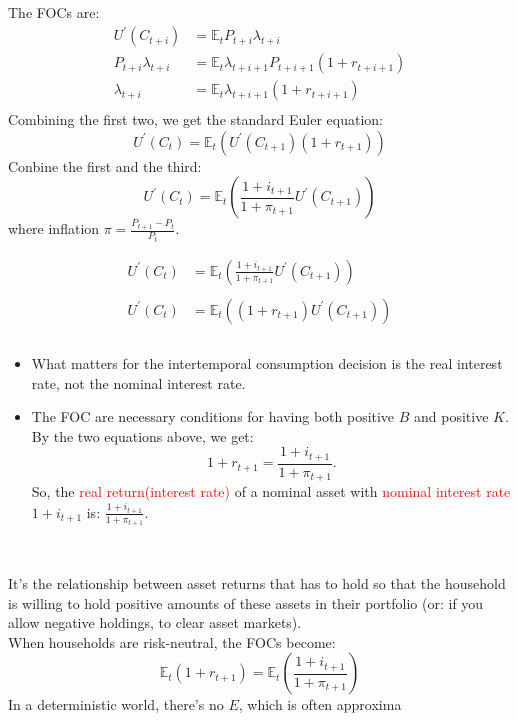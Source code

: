 The FOCs are:
\begin{align*}
    U^{\prime} (C_{t+i} ) &= \mathbb{E}_t P_{t+i}\lambda_{t+i}  \\
    P_{t+i}\lambda_{t+i} &= \mathbb{E}_t \lambda_{t+i+1} P_{t+i+1} (1+r_{t+i+1}) \\
    \lambda_{t+i} &= \mathbb{E}_t \lambda_{t+i+1} (1+r_{t+i+1}) \\
\end{align*}
Combining the first two, we get the standard Euler equation:
\[
    U^{\prime} (C_{t} ) = \mathbb{E}_t \left(U^{\prime} (C_{t+1} ) (1+r_{t+1})\right)
\]
Conbine the first and the third:
\[
    U^{\prime} (C_{t} ) = \mathbb{E}_t \left(\frac{1+i_{t+1}}{1+\pi_{t+1}} U^{\prime} (C_{t+1} )\right)
\]
where inflation $\pi = \frac{P_{t+1} - P_t}{P_t}$.

\begin{align*}
    U^{\prime} (C_{t} ) &= \mathbb{E}_t \left(\frac{1+i_{t+1}}{1+\pi_{t+1}} U^{\prime} (C_{t+1} )\right) \\\\
    U^{\prime} (C_{t} ) &= \mathbb{E}_t \left((1+r_{t+1}) U^{\prime} (C_{t+1} )\right) \\\\
\end{align*}

\begin{itemize}
    \item What matters for the intertemporal consumption decision is
    the real interest rate, not the nominal interest rate.
    \item The FOC are necessary conditions for having both positive $B$
    and positive $K$. By the two equations above, we get:
    \[1+r_{t+1} = \frac{1+i_{t+1}}{1+\pi_{t+1}}. \]
    So, the \textcolor{red}{real return(interest rate)} of a nominal asset
    with \textcolor{red}{nominal interest rate} $1+i_{t+1} $ is: $\frac{1+i_{t+1} }{1+\pi_{t+1}}$.
\end{itemize}

\begin{corollary}
    \ 

    It's the relationship between asset returns that has to hold 
    so that the household is willing to hold positive amounts 
    of these assets in their portfolio (or: if you allow negative 
    holdings, to clear asset markets). \\
    When households are risk-neutral, the FOCs become:
    \[\mathbb{E}_t (1+r_{t+1}) = \mathbb{E}_t \left(\frac{1+i_{t+1}}{1+\pi_{t+1}}\right) \]
    In a deterministic world, there's no $E$, which is often approxima
\end{corollary}

